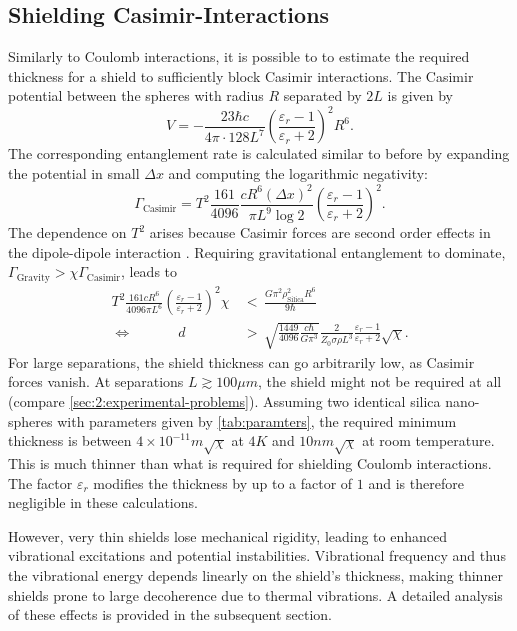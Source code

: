 \subsection{Shielding Casimir-Interactions}
Similarly to Coulomb interactions, it is possible to to estimate the required thickness for a shield to sufficiently block Casimir interactions.
The Casimir potential between the spheres with radius $R$ separated by $2L$ is given by \cite{Emig_2007}
\begin{equation}
  V = -\frac{23 \hbar c}{4\pi \cdot 128 L^7} \left( \frac{\varepsilon_r - 1}{\varepsilon_r + 2} \right)^2 R^6 .
\end{equation}
The corresponding entanglement rate is calculated similar to before by expanding the potential in small $\Delta x$ and computing the logarithmic negativity:
\begin{equation}
  \Gamma_\mathrm{Casimir} = T^2 \frac{161}{4096} \frac{c R^6 (\Delta x)^2}{\pi L^9 \log 2}\left( \frac{\varepsilon_r - 1}{\varepsilon_r + 2}\right)^2 .
\end{equation}
The dependence on $T^2$ arises because Casimir forces are second order effects in the dipole-dipole interaction \cite{Bordag_2001}.
Requiring gravitational entanglement to dominate, $\Gamma_\mathrm{Gravity} > \chi \Gamma_\mathrm{Casimir}$, leads to
\begin{align}
  T^2 \frac{161 c R^6}{4096 \pi L^6} \left( \frac{\varepsilon_r - 1}{\varepsilon_r + 2}\right)^2 \chi \, &< \, \frac{G \pi^2 \rho_\mathrm{Silica}^2 R^6}{9\hbar} \\
  \Longleftrightarrow \quad\quad\quad\  d \, &> \, \sqrt{\frac{1449}{4096} \frac{c \hbar}{G \pi^3}} \frac{2}{Z_0 \sigma \rho L^3} \frac{\varepsilon_r - 1}{\varepsilon_r + 2} \sqrt{\chi} .
\end{align}
For large separations, the shield thickness can go arbitrarily low, as Casimir forces vanish. At separations $L\gtrsim 100\si{\mu m}$, the shield might not be required at all (compare \cref{sec:2:experimental-problems}).
Assuming two identical silica nano-spheres with parameters given by \cref{tab:paramters}, the required minimum thickness is between $4\times 10^{-11}\si{m} \sqrt{\chi}$ at $4\si{K}$ and $10 \si{nm} \sqrt{\chi}$ at room temperature.
This is much thinner than what is required for shielding Coulomb interactions.
The factor $\varepsilon_r$ modifies the thickness by up to a factor of $1$ and is therefore negligible in these calculations.

However, very thin shields lose mechanical rigidity, leading to enhanced vibrational excitations and potential instabilities.
Vibrational frequency and thus the vibrational energy depends linearly on the shield's thickness, making thinner shields prone to large decoherence due to thermal vibrations.
A detailed analysis of these effects is provided in the subsequent section.



